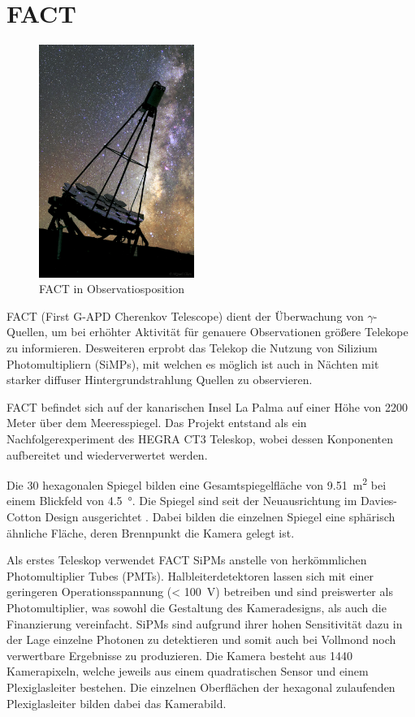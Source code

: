 \chapter{FACT}
\begin{figure}
  \includegraphics[width=0.45\textwidth]{./images/FACT.jpg}
  \caption{FACT in Observatiosposition \cite{factpic}}
  \label{fig:observ}
\end{figure}
FACT (First G-APD Cherenkov Telescope) dient der Überwachung von $\gamma$-Quellen, um bei erhöhter Aktivität für genauere Observationen größere Telekope zu informieren. 
Desweiteren erprobt das Telekop die Nutzung von Silizium Photomultipliern (SiMPs), mit welchen es möglich ist auch in Nächten mit starker diffuser Hintergrundstrahlung Quellen zu observieren. 

FACT befindet sich auf der kanarischen Insel La Palma auf einer Höhe von 2200 Meter über dem Meeresspiegel.
Das Projekt entstand als ein Nachfolgerexperiment des HEGRA CT3 Teleskop, wobei dessen Konponenten aufbereitet und wiederverwertet werden.

Die 30 hexagonalen Spiegel bilden eine Gesamtspiegelfläche von \SI{9.51}{\meter\squared} bei einem Blickfeld von \SI{4.5}{\degree}. 
Die Spiegel sind seit der Neuausrichtung im Davies-Cotton Design ausgerichtet \cite{design-detec}.
Dabei bilden die einzelnen Spiegel eine sphärisch ähnliche Fläche, deren Brennpunkt die Kamera gelegt ist.

Als erstes Teleskop verwendet FACT SiPMs anstelle von herkömmlichen Photomultiplier Tubes (PMTs). 
Halbleiterdetektoren lassen sich mit einer geringeren Operationsspannung (< \SI{100}{\volt}) betreiben und sind preiswerter als Photomultiplier, was sowohl die Gestaltung des Kameradesigns, als auch die Finanzierung vereinfacht. 
SiPMs sind aufgrund ihrer hohen Sensitivität dazu in der Lage einzelne Photonen zu detektieren und somit auch bei Vollmond noch verwertbare Ergebnisse zu produzieren.
Die Kamera besteht aus 1440 Kamerapixeln, welche jeweils aus einem quadratischen Sensor und einem Plexiglasleiter bestehen. Die einzelnen Oberflächen der hexagonal zulaufenden Plexiglasleiter bilden dabei das Kamerabild.

